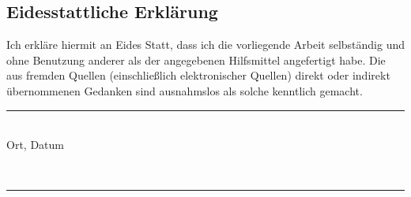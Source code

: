 \subsection*{Eidesstattliche Erklärung}
Ich erkläre hiermit an Eides Statt, dass ich die vorliegende Arbeit selbständig und ohne Benutzung anderer als der angegebenen Hilfsmittel angefertigt habe. Die aus fremden Quellen (einschließlich elektronischer Quellen) direkt oder indirekt übernommenen Gedanken sind ausnahmslos als solche kenntlich gemacht.

\begin{minipage}{0.3\textwidth}

	\noindent\rule[-14mm]{175px}{1pt}
	\ \\
	Ort, Datum

\end{minipage}
\begin{minipage}{0.2\textwidth}
	\
\end{minipage}
\begin{minipage}{0.3\textwidth}

	\noindent\rule[-14mm]{175px}{1pt}
	\ \\
	\varauthorprename \ \varauthorsurname

\end{minipage}